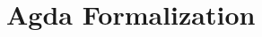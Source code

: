 \section{Agda Formalization}
\label{sec:formalization}

\begin{code}%
\>[0]\AgdaSpace{}%
\AgdaSpace{}%
\AgdaSymbol{:}\AgdaSpace{}%
\AgdaSpace{}%
\<%
\\
\>[0][@{}l@{\AgdaIndent{0}}]%
\>[2]\AgdaSpace{}%
\AgdaSpace{}%
\AgdaSpace{}%
\AgdaSpace{}%
\AgdaSymbol{:}\AgdaSpace{}%
\<%
\\
%
\>[2]\AgdaSpace{}%
\AgdaSpace{}%
\AgdaSymbol{:}\AgdaSpace{}%
\AgdaSpace{}%
\AgdaSpace{}%
\<%
\\
%
\>[2]\AgdaOperator{\AgdaInductiveConstructor{\AgdaUnderscore{}\&\AgdaUnderscore{}}}\AgdaSpace{}%
\AgdaSpace{}%
\AgdaSpace{}%
\AgdaSpace{}%
\AgdaSymbol{:}\AgdaSpace{}%
\AgdaSpace{}%
\AgdaSpace{}%
\AgdaSpace{}%
\AgdaSpace{}%
\<%
\end{code}

